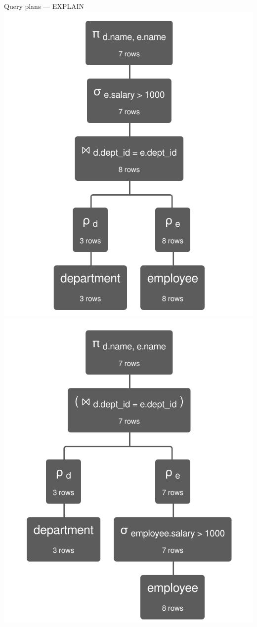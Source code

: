 \documentclass[12pt]{beamer}
\begin{document}
\begin{frame}[fragile]{Query plans --- EXPLAIN}
\includegraphics[scale=.2]{query1.png}
\includegraphics[scale=.2]{query2.png}
\end{frame}
\end{document}
